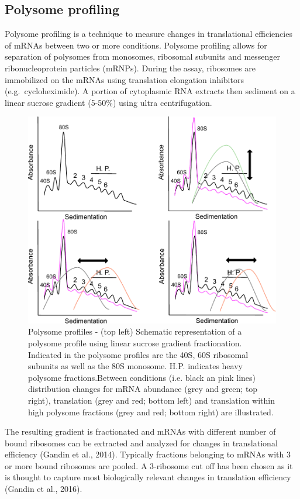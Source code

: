\documentclass[
  12pt,
  openany]{book}
\begin{document}
\subsection{Polysome profiling}

Polysome profiling is a technique to measure changes in translational efficiencies of mRNAs between two or more conditions. Polysome profiling allows for separation of polysomes from monosomes, ribosomal subunits and messenger ribonucleoprotein particles (mRNPs). During the assay, ribosomes are immobilized on the mRNAs using translation elongation inhibitors (e.g.~cycloheximide). A portion of cytoplasmic RNA extracts then sediment on a linear sucrose gradient (5-50\%) using ultra centrifugation.

\begin{figure}
    \includegraphics[width=0.9\linewidth]{./figures/polysome_shifts.pdf}
  \caption{Polysome profliles -  (top left) Schematic representation of a polysome profile using linear sucrose gradient fractionation. Indicated in the polysome profiles are the 40S, 60S ribosomal subunits as well as the 80S monosome. H.P. indicates heavy polysome fractions.Between conditions (i.e. black an pink lines) distribution changes for mRNA abundance (grey and green; top right), translation (grey and red; bottom left) and translation within high polysome fractions (grey and red; bottom right) are illustrated. \label{fig:polysome}}
\end{figure}

The resulting gradient is fractionated and mRNAs with different number of bound ribosomes can be extracted and analyzed for changes in translational efficiency (Gandin et al., 2014). Typically fractions belonging to mRNAs with 3 or more bound ribosomes are pooled. A 3-ribosome cut off has been chosen as it is thought to capture most biologically relevant changes in translation efficiency (Gandin et al., 2016).
\end{document}
